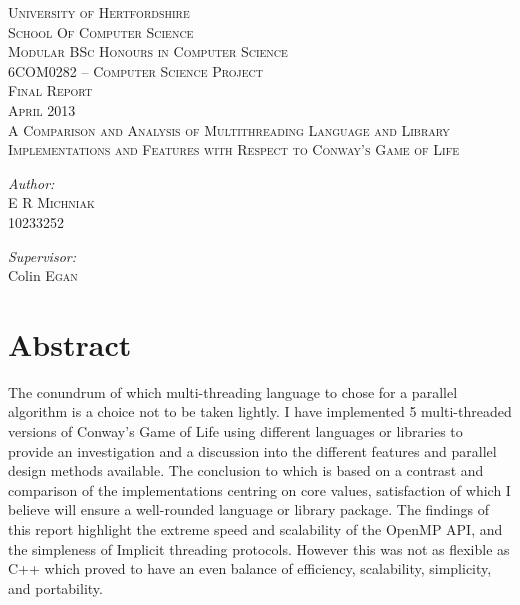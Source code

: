 \documentclass[11pt]{article} %
\begin{document}
\begin{titlepage}
\begin{center}
\textsc{\LARGE University of Hertfordshire}\\[0.5cm]
\textsc{\Large School Of Computer Science}\\[1.5cm]
\textsc{\Large Modular BSc Honours in Computer Science}\\[1.5cm]
\textsc{\Large 6COM0282 – Computer Science Project}\\[3cm]
\textsc{\Large Final Report}\\[0.5cm]
\textsc{\Large April 2013}\\[3.5cm]
\textsc{\Large A Comparison and Analysis of Multithreading Language and Library Implementations and Features with Respect to Conway's Game of Life}\\[0.5cm]
\vfill
\begin{minipage}{0.4\textwidth}
\begin{flushleft} \large
\emph{Author:}\\
E R \textsc{Michniak} \\ 10233252
\end{flushleft}
\end{minipage}
\begin{minipage}{0.4\textwidth}
\begin{flushright} \large
\emph{Supervisor:} \\
Colin \textsc{Egan} \\
\end{flushright}
\end{minipage}
\end{center}
\end{titlepage}

\pagebreak
\tableofcontents
\pagebreak
\section{Abstract}
The conundrum of which multi-threading language to chose for a parallel algorithm is a choice not to be taken lightly. I have implemented 5 multi-threaded versions of Conway's Game of Life using different languages or libraries to provide an investigation and a discussion into the different features and parallel design methods available. The conclusion to which is based on a contrast and comparison of the implementations centring on core values, satisfaction of which I believe will ensure a well-rounded language or library package. The findings of this report highlight the extreme speed and scalability of the OpenMP API, and the simpleness of Implicit threading protocols. However this was not as flexible as C++ which proved to have an even balance of efficiency, scalability, simplicity, and portability.
\end{document}
